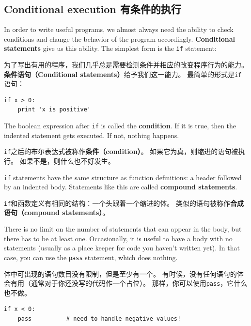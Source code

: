 \documentclass[10pt]{book}
\begin{document}
\begin{CJK}{UTF8}{gbsn}
\section{Conditional execution 有条件的执行}
\label{conditional.execution}

In order to write useful programs, we almost always need the ability
to check conditions and change the behavior of the program
accordingly.  {\bf Conditional statements} give us this ability.  The
simplest form is the {\tt if} statement:

为了写出有用的程序，我们几乎总是需要检测条件并相应的改变程序行为的能力。
{\bf 条件语句（Conditional statements）}给予我们这一能力。
最简单的形式是{\tt if}语句：

\begin{verbatim}
if x > 0:
    print 'x is positive'
\end{verbatim}
%
The boolean expression after {\tt if} is
called the {\bf condition}.  If it is true, then the indented
statement gets executed.  If not, nothing happens.

{\tt if}之后的布尔表达式被称作{\bf 条件（condition）}。
如果它为真，则缩进的语句被执行。
如果不是，则什么也不好发生。

{\tt if} statements have the same structure as function definitions:
a header followed by an indented body.  Statements like this are
called {\bf compound statements}.

{\tt if}和函数定义有相同的结构：一个头跟着一个缩进的体。
类似的语句被称作{\bf 合成语句（compound statements）}。

There is no limit on the number of statements that can appear in
the body, but there has to be at least one.
Occasionally, it is useful to have a body with no statements (usually
as a place keeper for code you haven't written yet).  In that
case, you can use the {\tt pass} statement, which does nothing.

体中可出现的语句数目没有限制，但是至少有一个。
有时候，没有任何语句的体会有用（通常对于你还没写的代码作一个占位）。
那样，你可以使用{\tt pass}，它什么也不做。

\begin{verbatim}
if x < 0:
    pass          # need to handle negative values!
\end{verbatim}
%


\end{CJK}
\end{document}
